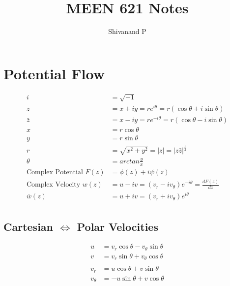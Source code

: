 \documentclass[11pt, letterpaper, notitlepage, landscape]{article}
\title{MEEN 621 Notes}
\author{Shivanand P}
\begin{document}
\sffamily
\sffamily{}

\maketitle
\renewcommand{\cftpartleader}{\cftdotfill{\cftdotsep}} %
\renewcommand{\cftsecleader}{\cftdotfill{\cftdotsep}}
\tableofcontents
\pagestyle{empty}

\newpage
\setcounter{page}{1}

\pagestyle{fancy}
\fancyhead{}    
\fancyfoot{}
\renewcommand{\headrulewidth}{0pt}
\renewcommand{\footrulewidth}{0pt}
\renewcommand{\arraystretch}{1.75}

\section{Potential Flow}
\begin{align*}
i &= \sqrt{-1} \\
z &= x + i y = r e^{i \theta} = r (\cos{\theta} + i \sin{\theta}) \\
\bar{z} &= x - i y = r e^{-i \theta} = r (\cos{\theta} - i \sin{\theta}) \\
x &= r \cos{\theta} \\
y &= r \sin{\theta} \\
r &= \sqrt{x^2 + y^2} = |z| = |z \bar{z}|^{\frac{1}{2}} \\
\theta &= arctan{\frac{y}{x}} \\
\text{Complex Potential\ } F(z) &= \phi(z) + i \psi(z) \\
\text{Complex Velocity\ } w(z) &= u - i v = (v_r - i v_{\theta}) e^{-i \theta} = \frac{dF(z)}{dz} \\
\bar{w}(z) &= u + i v = (v_r + i v_{\theta}) e^{i \theta} \\
\end{align*}

\subsection{Cartesian $\Leftrightarrow$ Polar Velocities}
\begin{align*}
u &= v_r \cos{\theta} - v_{\theta} \sin{\theta} \\
v &= v_r \sin{\theta} + v_{\theta} \cos{\theta} \\ \\
v_r &= u \cos{\theta} + v \sin{\theta} \\
v_{\theta} &= -u \sin{\theta} + v \cos{\theta} \\
\end{align*}
\end{document}
